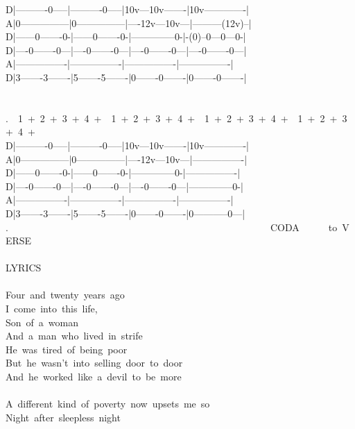{D|----------0-----|----------0-----|10v---10v-------|10v-------------|\\
A|0---------------|0---------------|----12v---10v---|---------(12v)--|\\
D|------0-------0-|------0-------0-|--------------0-|-(0)--0---0---0-|\\
D|----0-------0---|----0-------0---|----0-------0---|----0-------0---|\\
A|----------------|----------------|----------------|----------------|\\
D|3-------3-------|5-------5-------|0-------0-------|0-------0-------|\\
\\
\\
.\ \ 1\ +\ 2\ +\ 3\ +\ 4\ +\ \ 1\ +\ 2\ +\ 3\ +\ 4\ +\ \ 1\ +\ 2\ +\ 3\ +\ 4\ +\ \ 1\ +\ 2\ +\ 3\ +\ 4\ +\\
D|----------0-----|----------0-----|10v---10v-------|10v-------------|\\
A|0---------------|0---------------|----12v---10v---|----------------|\\
D|------0-------0-|------0-------0-|--------------0-|----------------|\\
D|----0-------0---|----0-------0---|----0-------0---|--------------0-|\\
A|----------------|----------------|----------------|----------------|\\
D|3-------3-------|5-------5-------|0-------0-------|0-----------0---|\\
.\ \ \ \ \ \ \ \ \ \ \ \ \ \ \ \ \ \ \ \ \ \ \ \ \ \ \ \ \ \ \ \ \ \ \ \ \ \ \ \ \ \ \ \ \ \ \ \ \ \ \ \ \ \lbrack\ CODA\rbrack\ \ \ \ \ \lbrack\ to\ VERSE\rbrack\\
\\
LYRICS\\
\\
Four\ and\ twenty\ years\ ago\\
I\ come\ into\ this\ life,\\
Son\ of\ a\ woman\\
And\ a\ man\ who\ lived\ in\ strife\\
He\ was\ tired\ of\ being\ poor\\
But\ he\ wasn't\ into\ selling\ door\ to\ door\\
And\ he\ worked\ like\ a\ devil\ to\ be\ more\\
\\
A\ different\ kind\ of\ poverty\ now\ upsets\ me\ so\\
Night\ after\ sleepless\ night\\
}
